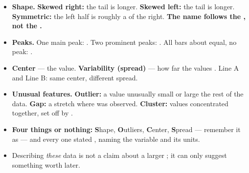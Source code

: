 \documentclass[12pt]{article}
\begin{document}
\boxguard[14]
\begin{tcolorbox}[enhanced, colback=sky, colframe=navy, boxrule=0.8pt, arc=2mm,
    left=3mm, right=3mm, top=1.5mm, bottom=1.5mm, breakable,
    fonttitle=\bfseries\small\color{white}, title={QuickNotes: Describing a Quantitative Distribution},
    attach boxed title to top left={yshift=-2mm, xshift=4mm},
    boxed title style={colback=navy, colframe=navy, arc=1.5mm}]
\small
\begin{itemize}[leftmargin=1.1em, itemsep=3pt]
  \item \textbf{Shape.} \textbf{Skewed right:} the \blank{1.6cm} tail is longer.
        \textbf{Skewed left:} the \blank{1.6cm} tail is longer. \textbf{Symmetric:} the left
        half is roughly a \blank{2.6cm} of the right.
        \textbf{The name follows the \blank{1.8cm}, not the \blank{1.6cm}.}
  \item \textbf{Peaks.} One main peak: \blank{2.2cm}. Two prominent peaks: \blank{2.2cm}.
        All bars about equal, no peak: \blank{2.4cm}.
  \item \textbf{Center} --- the \blank{2.2cm} value. \textbf{Variability (spread)} --- how far
        the values \blank{3.0cm}. Line A and Line B: same center, different spread.
  \item \textbf{Unusual features.} \textbf{Outlier:} a value unusually small or large
        \blank{3.4cm} the rest of the data. \textbf{Gap:} a stretch where \blank{2.6cm} was
        observed. \textbf{Cluster:} values concentrated together, set off by \blank{1.8cm}.
  \item \textbf{Four things or nothing:} \textbf{S}hape, \textbf{O}utliers, \textbf{C}enter,
        \textbf{S}pread --- remember it as \blank{1.8cm} --- and every one stated
        \blank{2.4cm}, naming the variable and its units.
  \item Describing \emph{these} data is not a claim about a larger \blank{2.4cm}; it can only
        suggest something worth \blank{2.4cm} later.
\end{itemize}
\end{tcolorbox}
\end{document}
